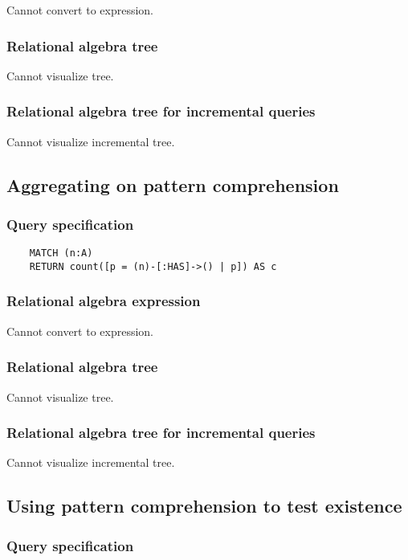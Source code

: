 	Cannot convert to expression.

	\subsubsection*{Relational algebra tree}

	Cannot visualize tree.

	\subsubsection*{Relational algebra tree for incremental queries}

	Cannot visualize incremental tree.
	\subsection{Aggregating on pattern comprehension}

	\subsubsection*{Query specification}

	\begin{lstlisting}
	MATCH (n:A)
	RETURN count([p = (n)-[:HAS]->() | p]) AS c
	\end{lstlisting}


	\subsubsection*{Relational algebra expression}

	Cannot convert to expression.

	\subsubsection*{Relational algebra tree}

	Cannot visualize tree.

	\subsubsection*{Relational algebra tree for incremental queries}

	Cannot visualize incremental tree.
	\subsection{Using pattern comprehension to test existence}

	\subsubsection*{Query specification}

